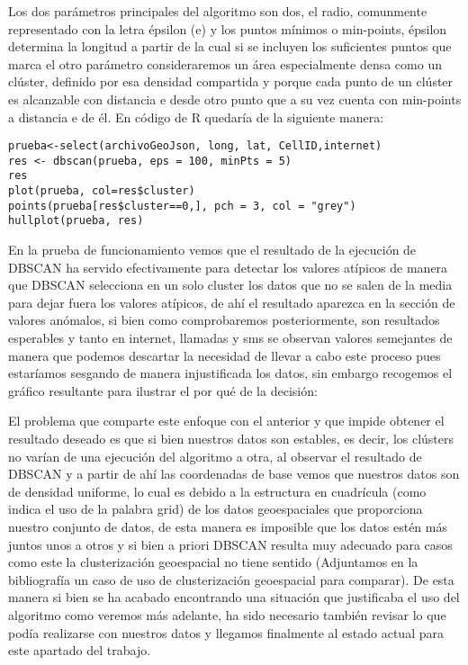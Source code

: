 \documentclass[11pt, a4paper]{article} %
\begin{document}
Los dos parámetros principales del algoritmo son dos, el radio, comunmente representado con la letra épsilon (e) y los puntos mínimos o min-points, épsilon determina la longitud a partir de la cual si se incluyen los suficientes puntos que marca el otro parámetro consideraremos un área especialmente densa como un clúster, definido por esa densidad compartida y porque cada punto de un clúster es alcanzable con distancia e desde otro punto que a su vez cuenta con min-points a distancia e de él. En código de R quedaría de la siguiente manera:
\begin{lstlisting}
prueba<-select(archivoGeoJson, long, lat, CellID,internet)
res <- dbscan(prueba, eps = 100, minPts = 5)
res
plot(prueba, col=res$cluster)
points(prueba[res$cluster==0,], pch = 3, col = "grey")
hullplot(prueba, res)
\end{lstlisting}


En la prueba de funcionamiento vemos que el resultado de la ejecución de DBSCAN ha servido efectivamente para detectar los valores atípicos de manera que DBSCAN selecciona en un solo cluster los datos que no se salen de la media para dejar fuera los valores atípicos, de ahí el resultado aparezca en la sección de valores anómalos, si bien como comprobaremos posteriormente, son resultados esperables y tanto en internet, llamadas y sms se observan valores semejantes de manera que podemos descartar la necesidad de llevar a cabo este proceso pues estaríamos sesgando de manera injustificada los datos, sin embargo recogemos el gráfico resultante para ilustrar el por qué de la decisión:


El problema que comparte este enfoque con el anterior y que impide obtener el resultado deseado es que si bien nuestros datos son estables, es decir, los clústers no varían de una ejecución del algoritmo a otra, al observar el resultado de DBSCAN y a partir de ahí las coordenadas de base vemos que nuestros datos son de densidad uniforme, lo cual es debido a la estructura en cuadrícula (como indica el uso de la palabra grid) de los datos geoespaciales que proporciona nuestro conjunto de datos, de esta manera es imposible que los datos estén más juntos unos a otros y si bien a priori DBSCAN resulta muy adecuado para casos como este la clusterización geoespacial no tiene sentido (Adjuntamos en la bibliografía un caso de uso de clusterización geoespacial para comparar). De esta manera si bien se ha acabado encontrando una situación que justificaba el uso del algoritmo como veremos más adelante, ha sido necesario también revisar lo que podía realizarse con nuestros datos y llegamos finalmente al estado actual para este apartado del trabajo.
\end{document}
